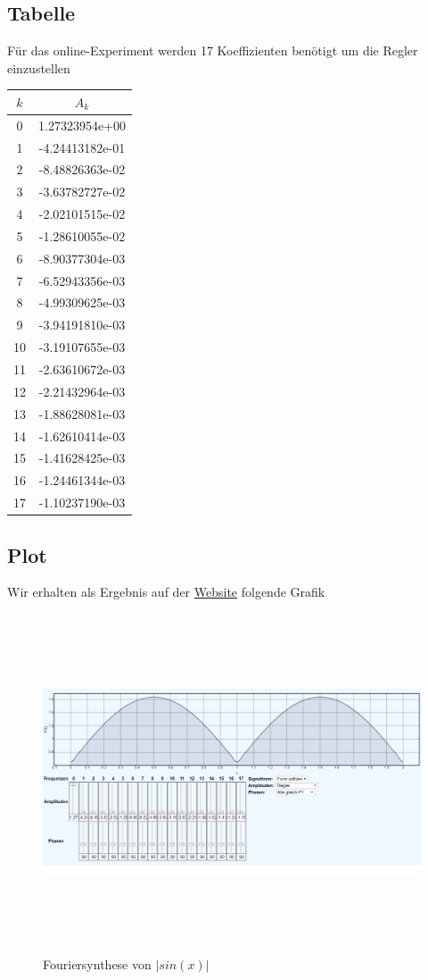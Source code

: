 \subsection{Tabelle}
Für das online-Experiment werden 17 Koeffizienten benötigt um die
Regler einzustellen 
\begin{table}
  \centering
  \label{tab:koeffizienten}
  \begin{tabular}{c c}
    \toprule
    $k$ & $A_k$\\
    \midrule
      0 & 1.27323954e+00\\
      1 & -4.24413182e-01\\ 
      2 & -8.48826363e-02\\ 
      3 & -3.63782727e-02\\
      4 & -2.02101515e-02\\
      5 & -1.28610055e-02\\ 
      6 & -8.90377304e-03\\
      7 & -6.52943356e-03\\
      8 & -4.99309625e-03\\
      9 & -3.94191810e-03\\
      10 & -3.19107655e-03\\
      11 & -2.63610672e-03\\
      12 & -2.21432964e-03\\
      13 & -1.88628081e-03\\
      14 & -1.62610414e-03\\
      15 & -1.41628425e-03\\
      16 & -1.24461344e-03\\
      17 & -1.10237190e-03\\
    \bottomrule
  \end{tabular}
\end{table}
\newpage
\subsection{Plot}
Wir erhalten als Ergebnis auf der
\href{https://www.j-berkemeier.de/Fouriersynthese.html}{Website}
folgende Grafik
\begin{figure}
  \centering
  \includegraphics[height=10cm]{content/screenshot_phase90}
  \caption{Fouriersynthese von $|sin(x)|$}
  \label{fig:sin}
\end{figure}
